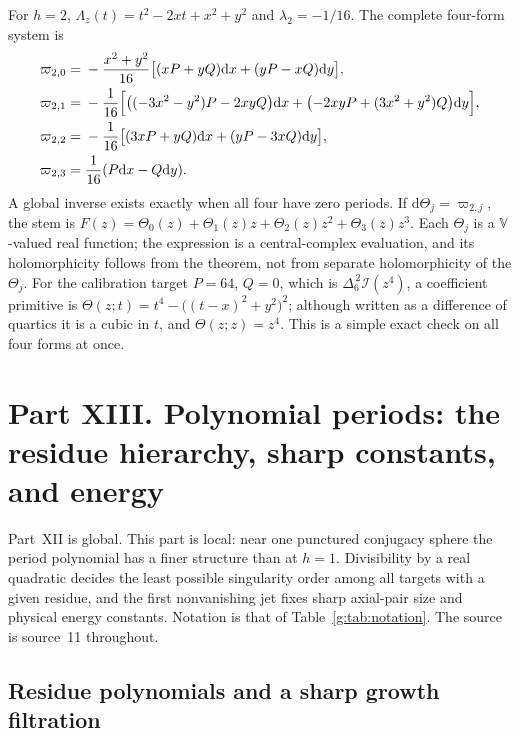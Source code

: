 \documentclass[11pt,a4paper]{article}
\numberwithin{equation}{section}
\theoremstyle{definition}
\theoremstyle{remark}
\theoremstyle{plain}
\newcommand{\I}{\mathcal I}
\newcommand{\dd}{\mathrm d}
\newcommand{\VV}{\mathbb V}                       %
\newcommand{\cur}{\varpi}                         %
\newcommand{\Herm}{\Theta}                        %
\newcommand{\Rq}{\Lambda}                         %
\begin{document}
For $h=2$, $\Rq_z(t)=t^2-2xt+x^2+y^2$ and $\lambda_2=-1/16$. The complete
four-form system is
\begin{align}
 \cur_{2,0}={}&-\frac{x^2+y^2}{16}\bigl[(xP+yQ)\dd x+(yP-xQ)\dd y\bigr],
 \label{g:eq:h2-0}\\
 \cur_{2,1}={}&-\frac1{16}\Bigl[\bigl((-3x^2-y^2)P-2xyQ\bigr)\dd x
 +\bigl(-2xyP+(3x^2+y^2)Q\bigr)\dd y\Bigr],\label{g:eq:h2-1}\\
 \cur_{2,2}={}&-\frac1{16}\bigl[(3xP+yQ)\dd x+(yP-3xQ)\dd y\bigr],
 \label{g:eq:h2-2}\\
 \cur_{2,3}={}&\frac1{16}(P\dd x-Q\dd y).\label{g:eq:h2-3}
\end{align}
A global inverse exists exactly when all four have zero periods. If
$\dd\Herm_j=\cur_{2,j}$, the stem is
$F(z)=\Herm_0(z)+\Herm_1(z)z+\Herm_2(z)z^2+\Herm_3(z)z^3$. Each $\Herm_j$ is a
$\VV$-valued real function; the expression is a central-complex evaluation, and
its holomorphicity follows from the theorem, not from separate holomorphicity
of the $\Herm_j$. For the calibration target $P=64$, $Q=0$, which is
$\Delta_6^{\,2}\I(z^4)$, a coefficient primitive is
$\Herm(z;t)=t^4-\bigl((t-x)^2+y^2\bigr)^2$; although written as a difference
of quartics it is a cubic in $t$, and $\Herm(z;z)=z^4$. This is a simple exact
check on all four forms at once.


\section[Part XIII. Polynomial periods: residues, sharp constants,
energy]{Part XIII. Polynomial periods: the residue hierarchy, sharp
constants, and energy}
\label{g:sec:local}

Part~XII is global. This part is local: near one punctured conjugacy sphere
the period polynomial has a finer structure than at $h=1$. Divisibility by a
real quadratic decides the least possible singularity order among all targets
with a given residue, and the first nonvanishing jet fixes sharp axial-pair
size and physical energy constants. Notation is that of
Table~\ref{g:tab:notation}. The source is source~11 throughout.

\subsection{Residue polynomials and a sharp growth filtration}
\label{g:sub:filtration}
\end{document}
